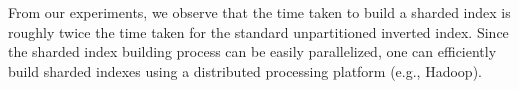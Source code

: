 
From our experiments, we observe that the time taken to build
a sharded index is roughly twice the time taken for the standard
unpartitioned inverted index. Since the sharded index building process
can be easily parallelized, one can efficiently build sharded indexes
using a distributed processing platform (e.g., Hadoop).


\begin{figure}[]
  \centering {}

\end{figure}
